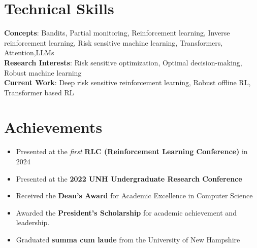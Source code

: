 \documentclass[letterpaper,11pt]{article}
\begin{document}
\section{Technical Skills}
    \begin{itemize}[leftmargin=0.15in, label={}]
	\small{\item{
		\textbf{Concepts}{: Bandits, Partial monitoring, Reinforcement learning, Inverse reinforcement learning, Risk sensitive machine learning, Transformers, Attention,LLMs} \\
		\textbf{Research Interests}{: Risk sensitive optimization, Optimal decision-making, Robust machine learning} \\
                \textbf{Current Work}{: Deep risk sensitive reinforcement learning, Robust offline RL, Transformer based RL} \\
	}}
    \end{itemize}
\vfill
\section{Achievements}
\begin{itemize} %
    \item Presented at the \emph{first} \textbf{RLC (Reinforcement Learning Conference)} in 2024
    \item Presented at the \textbf{2022 UNH Undergraduate Research Conference}
    \item Received the \textbf{Dean's Award} for Academic Excellence in Computer Science
    \item Awarded the \textbf{President's Scholarship} for academic achievement and leadership.
    \item Graduated \textbf{summa cum laude} from the University of New Hampshire
\end{itemize} %
\end{document}

